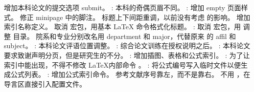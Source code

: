 \markdownRendererUlItem 增加本科论文的提交选项 submit。\markdownRendererUlItemEnd 
\markdownRendererUlItem {}: 本科的奇偶页眉不同。\markdownRendererUlItemEnd 
\markdownRendererUlItem {}: 增加 empty 页面样式。\markdownRendererUlItemEnd 
\markdownRendererUlItem 修正 minipage 中的脚注。\markdownRendererUlItemEnd 
\markdownRendererUlItem 标题上下间距重调，以前没有考虑  的影响。\markdownRendererUlItemEnd 
\markdownRendererUlItem 增加索引名称定义。\markdownRendererUlItemEnd 
\markdownRendererUlItem 取消  宏包，用基本 LaTeX 命令格式化标题。\markdownRendererUlItemEnd 
\markdownRendererUlItem {}: 取消  宏包，用  调整 目录。\markdownRendererUlItemEnd 
\markdownRendererUlItem 院系和专业分别改名用 department 和 major，代替原来 的 affil 和 subject。\markdownRendererUlItemEnd 
\markdownRendererUlItem {}: 本科论文评语位置调整。\markdownRendererUlItemEnd 
\markdownRendererUlItem {}: 综合论文训练在授权说明之后。\markdownRendererUlItemEnd 
\markdownRendererUlItem {}: 本科论文要求致谢声明分页，但是研究生的不分。\markdownRendererUlItemEnd 
\markdownRendererUlItem {}: 增加插图、表格和公式索引。\markdownRendererUlItemEnd 
\markdownRendererUlItem {}: 为了让索引中能出现，不得不修改 LaTeX内部命令 。\markdownRendererUlItemEnd 
\markdownRendererUlItem {}: 将公式编号写入临时文件以便生成公式列表。\markdownRendererUlItemEnd 
\markdownRendererUlItem {}: 增加公式索引命令。\markdownRendererUlItemEnd 
\markdownRendererUlItem 参考文献序号靠左，而不是靠右。\markdownRendererUlItemEnd 
\markdownRendererUlItem 不用 ，在导言区直接引入配置文件。\markdownRendererUlItemEnd 
\markdownRendererUlEnd \markdownRendererInterblockSeparator
